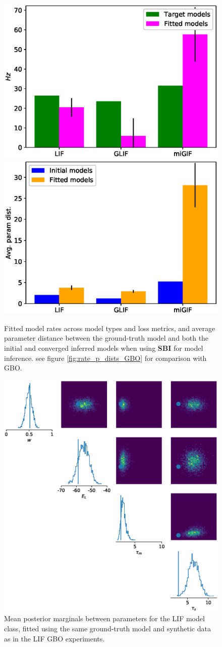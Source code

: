\documentclass[mphil,deptreport,ianc]{infthesis} %
\begin{document}
\begin{figure}
    \centering
	\includegraphics[width=0.49\columnwidth]{figures/sbi_plot_rates_all.eps}
	\includegraphics[width=0.49\columnwidth]{figures/sbi_mean_p_dist_all.eps}
	\caption{Fitted model rates across model types and loss metrics, and average parameter distance between the ground-truth model and both the initial and converged inferred models when using \textbf{SBI} for model inference. see figure \ref{fig:rate_p_dists_GBO} for comparison with GBO.}
	\label{fig:rate_p_dists_SBI}
\end{figure}


\begin{figure}
    \centering
	\includegraphics[width=0.5\columnwidth]{figures/sbi_p_avgs_pairplot_SNPE_LIF_12-15_04-56-19-338.eps}
	\caption{Mean posterior marginals between parameters for the LIF model class, fitted using the same ground-truth model and synthetic data as in the LIF GBO experiments.}
\end{figure}
\end{document}
